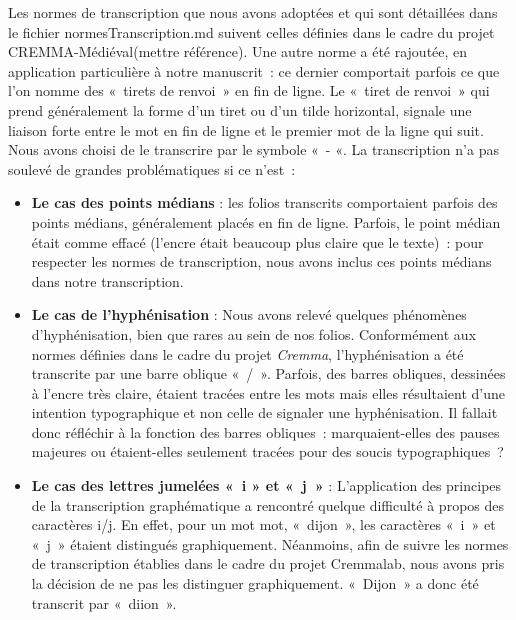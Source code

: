 \documentclass[12pt,a4paper,oneside,titlepage]{article} %
\begin{document}
Les normes de transcription que nous avons adoptées et qui sont détaillées dans le fichier normesTranscription.md suivent celles définies dans le cadre du projet CREMMA-Médiéval(mettre référence). Une autre norme a été rajoutée, en application particulière à notre manuscrit : ce dernier comportait parfois ce que l’on nomme des « tirets de renvoi » en fin de ligne. Le « tiret de renvoi » qui prend  généralement la forme d’un tiret ou d’un tilde horizontal, signale une liaison forte entre le mot en fin de ligne et  le premier mot de la ligne qui suit. Nous avons choisi de le transcrire par le symbole « - «.  
La transcription n’a pas soulevé de grandes problématiques si ce n’est :
\begin{itemize}
\item \textbf{Le cas des points médians} :  les folios transcrits comportaient parfois des points médians, généralement placés en fin de ligne. Parfois, le point médian était comme effacé (l’encre était beaucoup plus claire que le texte) : pour respecter les normes de transcription, nous avons inclus ces points médians dans notre transcription.

	\item
	\textbf{Le cas de l’hyphénisation }: 
Nous avons relevé quelques phénomènes d’hyphénisation, bien que rares au sein de nos folios. Conformément aux normes définies dans le cadre du projet \emph{Cremma}, l’hyphénisation a été transcrite par une barre oblique « / ». Parfois, des barres obliques, dessinées à l’encre très claire, étaient tracées entre les mots mais elles résultaient d’une intention typographique et non celle de signaler une hyphénisation. Il fallait donc réfléchir à la fonction des barres obliques : marquaient-elles des pauses majeures ou étaient-elles seulement tracées pour des soucis typographiques ? \\

\item
\textbf{Le cas des lettres jumelées « i » et « j »} : 
 L’application des principes de la transcription graphématique a rencontré quelque difficulté à propos des caractères i/j. En effet, pour un mot mot, « dijon », les caractères « i » et « j » étaient distingués graphiquement. Néanmoins, afin de suivre les normes de transcription établies dans le cadre du projet Cremmalab, nous avons pris la décision de ne pas les distinguer graphiquement. « Dijon » a donc été transcrit par « diion ».\\
 
\end{itemize}
\end{document}
